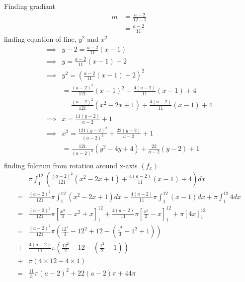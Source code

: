 \documentclass{article}
\begin{document}
Finding gradiant
\begin{align*}
    m &= \frac{a-2}{12-1}\\
      &= \frac{a-2}{11}
\end{align*}
finding equation of line, $y^2$ and $x^2$
\begin{align*}
    \implies &y-2 = \frac{a-2}{11}(x - 1)\\
    \implies &y   = \frac{a-2}{11}(x-1) + 2\\
    \implies &y^2 = \left(\frac{a-2}{11}(x-1) + 2\right)^2\\
             &    = \frac{(a-2)^2}{121}(x-1)^2 + \frac{4(a-2)}{11}(x - 1) + 4\\
             &    = \frac{(a-2)^2}{121}(x^2-2x+1) + \frac{4(a-2)}{11}(x - 1) + 4\\
    \implies& x = \frac{11(y-2)}{a-2} + 1\\
    \implies& x^2 = \frac{121(y-2)^2}{(a-2)^2} + \frac{22(y-2)}{a-2} + 1\\
            & = \frac{121}{(a-2)^2}(y^2-4y+4) + \frac{22}{a-2}(y-2) + 1\\
\end{align*}
finding fulcrum from rotation around x-axis $(f_x)$
\begin{align*}
    &\pi\int^{12}_1 \left( \frac{(a-2)^2}{121}(x^2-2x+1) + \frac{4(a-2)}{11}(x - 1) + 4 \right) dx\\
    =&\frac{(a-2)^2}{121}\pi\int^{12}_1 (x^2-2x+1)dx + \frac{4(a-2)}{11}\pi\int^{12}_1(x-1)dx + \pi\int^{12}_1 4dx\\
    =&\frac{(a-2)^2}{121}\pi\left[\frac{x^3}{3}-x^2+x\right]^{12}_1 
    + \frac{4(a-2)}{11}\pi\left[\frac{x^2}{2}-x\right]^{12}_1 
    +\pi\left[4x\right]^{12}_1\\
    =&\frac{(a-2)^2}{121}\pi\left(\frac{12^3}{3}-12^2+12 - \left(\frac{1^3}{3}-1^2+1\right)\right)\\
    +&\frac{4(a-2)}{11}\pi\left(\frac{12^2}{2}-12 - \left(\frac{1^2}{2}-1\right)\right)\\
    +&\pi(4\times12 - 4\times1)\\
    =& \frac{11}{3}\pi(a-2)^2 + 22(a-2)\pi + 44\pi\\
\end{align*}
\end{document}
